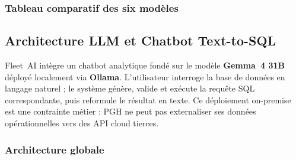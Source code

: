 \subsubsection{Tableau comparatif des six modèles}

\begin{table}[H]
\centering
\setlength{\arrayrulewidth}{1pt}
\caption{Comparatif des six modèles ML déployés dans Fleet~AI}
\label{tab:ml-comparatif}
\end{table}
\setlength{\arrayrulewidth}{0.4pt}

\subsection{Architecture LLM et Chatbot Text-to-SQL}

Fleet~AI intègre un chatbot analytique fondé sur le modèle \textbf{Gemma~4 31B} déployé localement via \textbf{Ollama}. L'utilisateur interroge la base de données en langage naturel ; le système génère, valide et exécute la requête SQL correspondante, puis reformule le résultat en texte. Ce déploiement on-premise est une contrainte métier : PGH ne peut pas externaliser ses données opérationnelles vers des API cloud tierces.

\subsubsection{Architecture globale}

